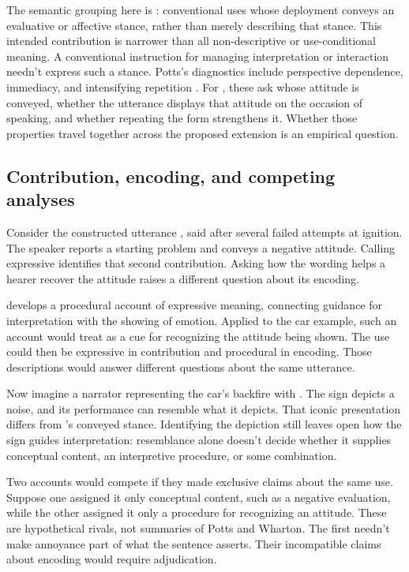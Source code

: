 The semantic grouping here is : conventional uses
whose deployment conveys an evaluative or affective stance, rather than
merely describing that stance. This intended contribution is narrower than
all non-descriptive or use-conditional meaning. A conventional instruction
for managing interpretation or interaction needn't express such a stance.
Potts's diagnostics include perspective dependence, immediacy, and
intensifying repetition \citep[166--167]{potts2007}. For ,
these ask whose attitude is conveyed, whether the utterance displays
that attitude on the occasion of speaking, and whether repeating the
form strengthens it. Whether those properties travel together across
the proposed extension is an empirical question.

\subsection{Contribution, encoding, and competing analyses}\label{sec:encoding}

Consider the constructed utterance ,
said after several failed attempts at ignition. The speaker reports a
starting problem and conveys a negative attitude. Calling 
expressive identifies that second contribution. Asking how the wording
helps a hearer recover the attitude raises a different question about
its encoding.

\textcite{wharton2016expressives} develops a procedural account of expressive
meaning, connecting guidance for interpretation with the showing of emotion.
Applied to the car example, such an account would treat 
as a cue for recognizing the attitude being shown. The use could then
be expressive in contribution and procedural in encoding. Those descriptions
would answer different questions about the same utterance.

Now imagine a narrator representing the car's backfire with .
The sign depicts a noise, and its performance can resemble what it
depicts. That iconic presentation differs from 's conveyed
stance. Identifying the depiction still leaves open how the sign guides
interpretation: resemblance alone doesn't decide whether it supplies
conceptual content, an interpretive procedure, or some combination.

Two accounts would compete if they made exclusive claims
about the same  use. Suppose one assigned it only
conceptual content, such as a negative evaluation, while the other
assigned it only a procedure for recognizing an attitude. These are
hypothetical rivals, not summaries of Potts and Wharton. The first
needn't make annoyance part of what the sentence asserts. Their
incompatible claims about encoding would require adjudication.

